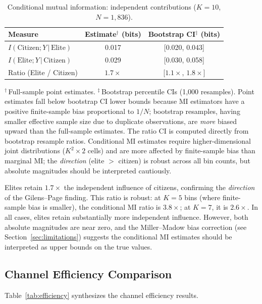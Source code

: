 \documentclass[twocolumn,10pt]{article}
\begin{document}
\begin{table}[t]
\centering
\caption{Conditional mutual information: independent contributions ($K=10$, $N=1{,}836$).}
\label{tab:conditional}
\begin{tabular}{@{}lcc@{}}
\toprule
Measure & Estimate$^\dagger$ (bits) & Bootstrap CI$^\ddagger$ (bits) \\
\midrule
$I(\text{Citizen}; Y \,|\, \text{Elite})$ & 0.017 & [0.020, 0.043] \\
$I(\text{Elite}; Y \,|\, \text{Citizen})$ & 0.029 & [0.030, 0.058] \\
\midrule
Ratio (Elite / Citizen) & $1.7\times$ & [$1.1\times$, $1.8\times$] \\
\bottomrule
\end{tabular}
\smallskip

\footnotesize{$^\dagger$\,Full-sample point estimates.  $^\ddagger$\,Bootstrap percentile CIs (1,000 resamples).  Point estimates fall below bootstrap CI lower bounds because MI estimators have a positive finite-sample bias proportional to $1/N$; bootstrap resamples, having smaller effective sample size due to duplicate observations, are \emph{more} biased upward than the full-sample estimates.  The ratio CI is computed directly from bootstrap resample ratios.  Conditional MI estimates require higher-dimensional joint distributions ($K^2 \times 2$ cells) and are more affected by finite-sample bias than marginal MI; the \emph{direction} (elite $>$ citizen) is robust across all bin counts, but absolute magnitudes should be interpreted cautiously.}
\end{table}

Elites retain $1.7\times$ the independent influence of citizens, confirming the \emph{direction} of the Gilens--Page finding.  This ratio is robust: at $K=5$ bins (where finite-sample bias is smaller), the conditional MI ratio is $3.8\times$; at $K=7$, it is $2.6\times$.  In all cases, elites retain substantially more independent influence.  However, both absolute magnitudes are near zero, and the Miller--Madow bias correction (see Section~\ref{sec:limitations}) suggests the conditional MI estimates should be interpreted as upper bounds on the true values.

\subsection{Channel Efficiency Comparison}

Table~\ref{tab:efficiency} synthesizes the channel efficiency results.
\end{document}
